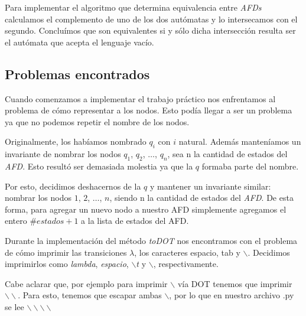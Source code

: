 Para implementar el algoritmo que determina equivalencia entre \emph{AFDs} calculamos el complemento de uno de los dos autómatas y lo intersecamos con el segundo. Concluímos que son equivalentes si y sólo dicha intersección resulta ser el autómata que acepta el lenguaje vacío.


\subsection{Problemas encontrados}

Cuando comenzamos a implementar el trabajo práctico nos enfrentamos al problema de cómo representar a los nodos. Esto podía llegar a ser un problema ya que no podemos repetir el nombre de los nodos.

Originalmente, los habíamos nombrado \emph{$q_i$} con $i$ natural. Además manteníamos un invariante de nombrar los nodos $q_1$, $q_2$, $\hdots$, $q_n$, sea n la cantidad de estados del \emph{AFD}. Esto resultó ser demasiada molestia ya que la $q$ formaba parte del nombre.

Por esto, decidimos deshacernos de la $q$ y mantener un invariante similar: nombrar los nodos $1$, $2$, $\hdots$, $n$, siendo n la cantidad de estados del \emph{AFD}. De esta forma, para agregar un nuevo nodo a nuestro AFD simplemente agregamos el entero $\#estados + 1$ a la lista de estados del AFD.


Durante la implementación del método \emph{toDOT} nos encontramos con el problema de cómo imprimir las transiciones $\lambda$, los caracteres espacio, tab y $\backslash$. Decidimos imprimirlos como \emph{lambda}, \emph{espacio},  \emph{$\backslash$t} y $\backslash$, respectivamente.

Cabe aclarar que, por ejemplo para imprimir $\backslash$ vía DOT tenemos que imprimir $\backslash\backslash$. Para esto, tenemos que escapar ambas $\backslash$, por lo que en nuestro archivo .py se lee $\backslash\backslash\backslash\backslash$